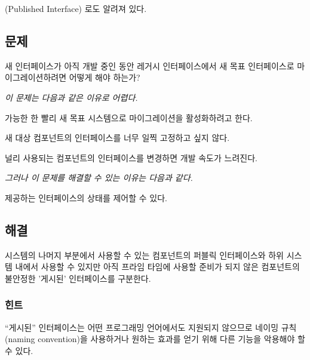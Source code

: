 \documentclass[a4paper,10pt,twoside]{book}
\begin{document}
(Published Interface) \cite{Ocal00a}로도 알려져 있다.


\subsection*{문제}

새 인터페이스가 아직 개발 중인 동안 레거시 인터페이스에서 새 목표 인터페이스로 마이그레이션하려면 어떻게 해야 하는가?

\emph{이 문제는 다음과 같은 이유로 어렵다.}

\begin{bulletlist}
\item 가능한 한 빨리 새 목표 시스템으로 마이그레이션을 활성화하려고 한다.

\item 새 대상 컴포넌트의 인터페이스를 너무 일찍 고정하고 싶지 않다.

\item 널리 사용되는 컴포넌트의 인터페이스를 변경하면 개발 속도가 느려진다.
\end{bulletlist}

\emph{그러나 이 문제를 해결할 수 있는 이유는 다음과 같다.}

\begin{bulletlist}
\item 제공하는 인터페이스의 상태를 제어할 수 있다.
\end{bulletlist}

\subsection*{해결}

시스템의 나머지 부분에서 사용할 수 있는 컴포넌트의 퍼블릭 인터페이스와 하위 시스템 내에서 사용할 수 있지만 아직 프라임 타임에 사용할 준비가 되지 않은 컴포넌트의 불안정한 '게시된' 인터페이스를 구분한다.

\subsubsection*{힌트}

``게시된'' 인터페이스는 어떤 프로그래밍 언어에서도 지원되지 않으므로 네이밍 규칙(naming convention)을 사용하거나 원하는 효과를 얻기 위해 다른 기능을 악용해야 할 수 있다.
\end{document}
